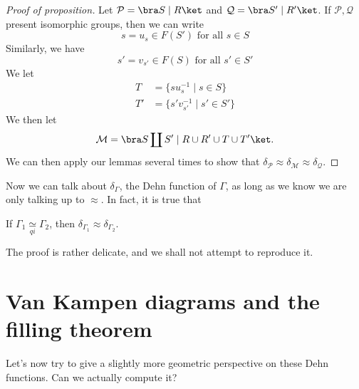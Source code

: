 \documentclass[a4paper]{article}
\newcommand{\qi}{\underset{qi}{\simeq}}
\begin{document}
\begin{proof}[Proof of proposition]
  Let $\mathcal{P} = \bra S \mid R \ket$ and $\mathcal{Q} = \bra S' \mid R'\ket$. If $\mathcal{P}, \mathcal{Q}$ present isomorphic groups, then we can write
  \[
    s = u_{s} \in F(S') \text{ for all }s \in S
  \]
  Similarly, we have
  \[
    s' = v_{s'} \in F(S)\text{ for all }s' \in S'
  \]
  We let
  \begin{align*}
    T &= \{s u_s^{-1} \mid s \in S\}\\
    T' &= \{s' v_{s'}^{-1} \mid s' \in S'\}
  \end{align*}
  We then let
  \[
    \mathcal{M} = \bra S \coprod S' \mid R \cup R' \cup T \cup T'\ket.
  \]
  We can then apply our lemmas several times to show that $\delta_{\mathcal{P}} \approx \delta_{\mathcal{M}} \approx \delta_{\mathcal{Q}}$.
\end{proof}

Now we can talk about $\delta_{\Gamma}$, the Dehn function of $\Gamma$, as long as we know we are only talking up to $\approx$. In fact, it is true that

\begin{fact}
  If $\Gamma_1 \qi \Gamma_2$, then $\delta_{\Gamma_1} \approx \delta_{\Gamma_2}$.
\end{fact}
The proof is rather delicate, and we shall not attempt to reproduce it.

\section{Van Kampen diagrams and the filling theorem}
Let's now try to give a slightly more geometric perspective on these Dehn functions. Can we actually compute it?
\end{document}
